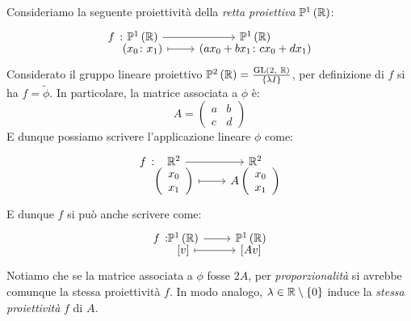 \begin{example}
	Consideriamo la seguente proiettività della \textit{retta proiettiva} $\proj[1]{\realset}$:
	\begin{equation*}
		\funztot{f}{\proj[1]{\realset}}{\proj[1]{\realset}}{\left(x_0\colon x_1\right)}{\left(ax_0+bx_1\colon cx_0+dx_1\right)}
	\end{equation*}
	Considerato il gruppo lineare proiettivo $\proj[2]{\realset}=\frac{\gl\left(2,\ \realset\right)}{\left\{\lambda I\right\}}$, per definizione di $f$ si ha $f=\tilde{\phi}$. In particolare, la matrice associata a $\phi$ è:
	\begin{equation*}
		A=\left(\begin{array}{cc}
			a & b\\
			c & d
		\end{array}\right)
	\end{equation*}
	E dunque possiamo scrivere l'applicazione lineare $\phi$ come:
	\begin{equation*}
		\funztot{f}{\realset^2}{\realset^2}{\left(\begin{array}{c}
				x_0 \\
				x_1
			\end{array}\right)}{A\left(\begin{array}{c}
				x_0 \\
				x_1
			\end{array}\right)}
	\end{equation*}
	E dunque $f$ si può anche scrivere come:
	\begin{equation*}
		\funztot{f}{\proj[1]{\realset}}{\proj[1]{\realset}}{\left[v\right]}{\left[Av\right]}
	\end{equation*}
	Notiamo che se la matrice associata a $\phi$ fosse $2A$, per \textit{proporzionalità} si avrebbe comunque la stessa proiettività $f$. In modo analogo, $\lambda\in\mathbb{R}\setminus\left\{0\right\}$ induce la \textit{stessa proiettività} $f$ di $A$.
\end{example}
